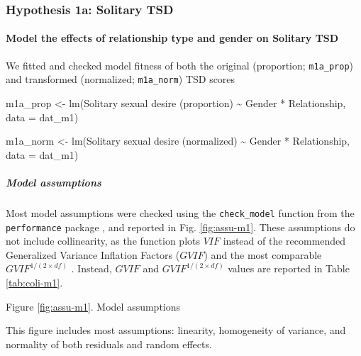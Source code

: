 \documentclass[
  bookmarksnumbered]{article}
\newenvironment{Shaded}{\begin{snugshade}}{\end{snugshade}}
\newcommand{\AttributeTok}[1]{\textcolor[rgb]{0.80,0.80,0.80}{#1}}
\newcommand{\FunctionTok}[1]{\textcolor[rgb]{0.94,0.94,0.56}{#1}}
\newcommand{\NormalTok}[1]{\textcolor[rgb]{0.80,0.80,0.80}{#1}}
\newcommand{\OtherTok}[1]{\textcolor[rgb]{0.94,0.94,0.56}{#1}}
\newcommand{\SpecialCharTok}[1]{\textcolor[rgb]{0.86,0.64,0.64}{#1}}
\newcommand{\StringTok}[1]{\textcolor[rgb]{0.80,0.58,0.58}{#1}}
\begin{document}
\subsubsection{Hypothesis 1a: Solitary TSD}\label{hypothesis1a}

\paragraph{Model the effects of relationship type and gender on Solitary TSD}\label{model-the-effects-of-relationship-type-and-gender-on-solitary-tsd}

We fitted and checked model fitness of both the original (proportion; \texttt{m1a\_prop}) and transformed (normalized; \texttt{m1a\_norm}) TSD scores

\begin{Shaded}
\begin{Highlighting}[]
\NormalTok{m1a\_prop }\OtherTok{\textless{}{-}} \FunctionTok{lm}\NormalTok{(}\StringTok{\textasciigrave{}}\AttributeTok{Solitary sexual desire (proportion)}\StringTok{\textasciigrave{}} \SpecialCharTok{\textasciitilde{}}\NormalTok{ Gender }\SpecialCharTok{*}\NormalTok{ Relationship,}
            \AttributeTok{data =}\NormalTok{ dat\_m1)}

\NormalTok{m1a\_norm }\OtherTok{\textless{}{-}} \FunctionTok{lm}\NormalTok{(}\StringTok{\textasciigrave{}}\AttributeTok{Solitary sexual desire (normalized)}\StringTok{\textasciigrave{}} \SpecialCharTok{\textasciitilde{}}\NormalTok{ Gender }\SpecialCharTok{*}\NormalTok{ Relationship,}
           \AttributeTok{data =}\NormalTok{ dat\_m1)}
\end{Highlighting}
\end{Shaded}

\subparagraph{Model assumptions}\label{model-assumptions}

Most model assumptions were checked using the \texttt{check\_model} function from the \texttt{performance} package \autocite{ludecke2021}, and reported in Fig. \ref{fig:assu-m1}. These assumptions do not include collinearity, as the function plots \(VIF\) instead of the recommended Generalized Variance Inflation Factors (\(GVIF\)) and the most comparable \(GVIF^{{1}/{(2 \times df)}}\) \autocite{fox1992}. Instead, \(GVIF\) and \(GVIF^{{1}/{(2 \times df)}}\) values are reported in Table \ref{tab:coli-m1}.

Figure \ref{fig:assu-m1}. Model assumptions

This figure includes most assumptions: linearity, homogeneity of variance, and normality of both residuals and random effects.
\end{document}
